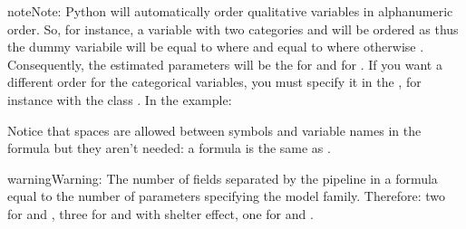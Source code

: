 \documentclass[letterpaper,10pt,english]{sphinxmanual}
\begin{document}
\begin{sphinxadmonition}{note}{Note:}
\sphinxAtStartPar
Python will automatically order qualitative variables in alphanumeric order. So, for
instance, a variable  with two categories  and  will be ordered as
\sphinxcode{\sphinxupquote{{[}"F", "M"{]}}} thus the dummy variabile will be equal to  where  and equal
to  where otherwise . Consequently, the estimated parameters will be the
 for  and  for . If you want a different order
for the categorical variables, you must specify it in the , for instance with the
 class . In the example:
\def\sphinxLiteralBlockLabel{\label{\detokenize{manual:id39}}}
\begin{sphinxVerbatim}[commandchars=\\\{\},numbers=left,firstnumber=1,stepnumber=1]
\PYG{p}{[}\PYG{p}{]}  
    \PYG{p}{[}\PYG{p}{]}
    \PYG{p}{[} \PYG{p}{]}
\end{sphinxVerbatim}
\end{sphinxadmonition}

\sphinxAtStartPar
Notice that spaces are allowed between symbols and variable names in the formula but they aren’t
needed: a formula  is the same as .

\begin{sphinxadmonition}{warning}{Warning:}
\sphinxAtStartPar
The number of fields separated by the pipeline \sphinxcode{\sphinxupquote{|}} in a formula  equal to
the number of parameters specifying the model family. Therefore: two for  and ,
three for  and  with shelter effect, one for  and .
\end{sphinxadmonition}
\end{document}

